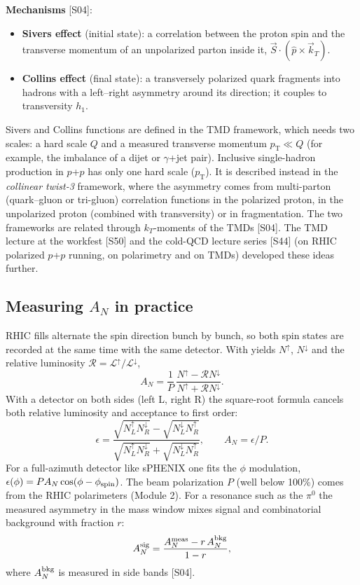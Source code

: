 \documentclass[11pt,letterpaper]{article}
\newcommand{\pT}{p_{\mathrm{T}}}
\begin{document}
\textbf{Mechanisms} [S04]:
\begin{itemize}
\item \textbf{Sivers effect} (initial state): a correlation between the proton spin and the transverse momentum of an
unpolarized parton inside it, $\vec S\cdot(\hat p\times\vec k_T)$.
\item \textbf{Collins effect} (final state): a transversely polarized quark fragments into hadrons with a left--right
asymmetry around its direction; it couples to transversity $h_1$.
\end{itemize}
Sivers and Collins functions are defined in the TMD framework, which needs two scales: a hard scale $Q$ and a measured
transverse momentum $\pT\ll Q$ (for example, the imbalance of a dijet or $\gamma$+jet pair). Inclusive single-hadron
production in $p$+$p$ has only one hard scale ($\pT$). It is described instead in the \emph{collinear twist-3} framework,
where the asymmetry comes from multi-parton (quark--gluon or tri-gluon) correlation functions in the polarized proton,
in the unpolarized proton (combined with transversity) or in fragmentation. The two frameworks are related through
$k_T$-moments of the TMDs [S04]. The TMD lecture at the workfest [S50] and the cold-QCD lecture series [S44] (on RHIC polarized
$p$+$p$ running, on polarimetry and on TMDs) developed these ideas further.

\subsection{Measuring $A_N$ in practice}
RHIC fills alternate the spin direction bunch by bunch, so both spin states are recorded at the same time with the same
detector. With yields $N^\uparrow$, $N^\downarrow$ and the relative luminosity $\mathcal R=\mathcal L^\uparrow/\mathcal L^\downarrow$,
\begin{equation}
A_N=\frac{1}{P}\,\frac{N^\uparrow-\mathcal R N^\downarrow}{N^\uparrow+\mathcal R N^\downarrow}.
\end{equation}
With a detector on both sides (left L, right R) the square-root formula cancels both relative luminosity and acceptance to
first order:
\begin{equation}
\epsilon=\frac{\sqrt{N_L^\uparrow N_R^\downarrow}-\sqrt{N_L^\downarrow N_R^\uparrow}}{\sqrt{N_L^\uparrow N_R^\downarrow}+\sqrt{N_L^\downarrow N_R^\uparrow}},\qquad A_N=\epsilon/P .
\end{equation}
For a full-azimuth detector like sPHENIX one fits the $\phi$ modulation, $\epsilon(\phi)=PA_N\cos(\phi-\phi_{\rm spin})$.
The beam polarization $P$ (well below 100\%) comes from the RHIC polarimeters (Module 2). For a resonance such as the $\pi^0$
the measured asymmetry in the mass window mixes signal and combinatorial background with fraction $r$:
\begin{equation}
A_N^{\rm sig}=\frac{A_N^{\rm meas}-r\,A_N^{\rm bkg}}{1-r},
\end{equation}
where $A_N^{\rm bkg}$ is measured in side bands [S04].
\end{document}
